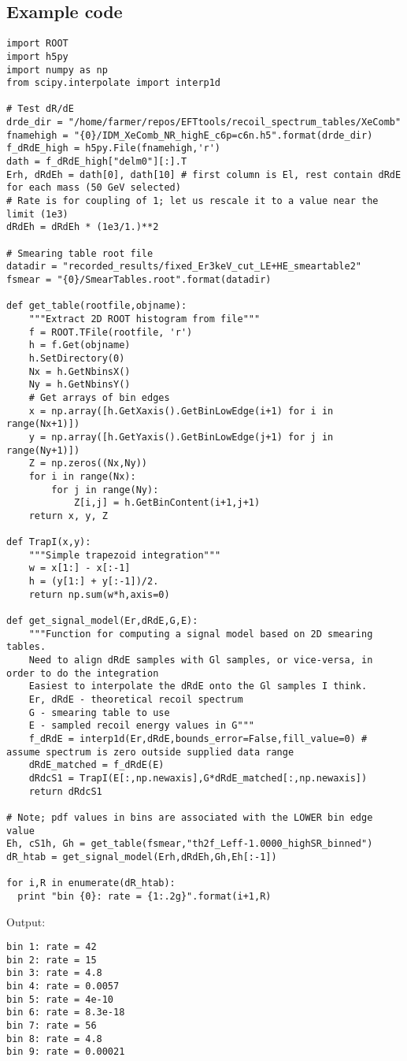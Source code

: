 \subsection{Example code}
\label{app:example_code}
\begin{lstlisting}
import ROOT
import h5py
import numpy as np
from scipy.interpolate import interp1d

# Test dR/dE
drde_dir = "/home/farmer/repos/EFTtools/recoil_spectrum_tables/XeComb"
fnamehigh = "{0}/IDM_XeComb_NR_highE_c6p=c6n.h5".format(drde_dir)
f_dRdE_high = h5py.File(fnamehigh,'r')
dath = f_dRdE_high["delm0"][:].T
Erh, dRdEh = dath[0], dath[10] # first column is El, rest contain dRdE for each mass (50 GeV selected)
# Rate is for coupling of 1; let us rescale it to a value near the limit (1e3)
dRdEh = dRdEh * (1e3/1.)**2

# Smearing table root file
datadir = "recorded_results/fixed_Er3keV_cut_LE+HE_smeartable2"
fsmear = "{0}/SmearTables.root".format(datadir)

def get_table(rootfile,objname):
    """Extract 2D ROOT histogram from file""" 
    f = ROOT.TFile(rootfile, 'r')
    h = f.Get(objname)
    h.SetDirectory(0)
    Nx = h.GetNbinsX()
    Ny = h.GetNbinsY()
    # Get arrays of bin edges
    x = np.array([h.GetXaxis().GetBinLowEdge(i+1) for i in range(Nx+1)])
    y = np.array([h.GetYaxis().GetBinLowEdge(j+1) for j in range(Ny+1)])
    Z = np.zeros((Nx,Ny))
    for i in range(Nx):
        for j in range(Ny):
            Z[i,j] = h.GetBinContent(i+1,j+1)
    return x, y, Z

def TrapI(x,y):
    """Simple trapezoid integration"""
    w = x[1:] - x[:-1]
    h = (y[1:] + y[:-1])/2.
    return np.sum(w*h,axis=0)

def get_signal_model(Er,dRdE,G,E):
    """Function for computing a signal model based on 2D smearing tables.
    Need to align dRdE samples with Gl samples, or vice-versa, in order to do the integration
    Easiest to interpolate the dRdE onto the Gl samples I think.
    Er, dRdE - theoretical recoil spectrum
    G - smearing table to use
    E - sampled recoil energy values in G"""
    f_dRdE = interp1d(Er,dRdE,bounds_error=False,fill_value=0) # assume spectrum is zero outside supplied data range
    dRdE_matched = f_dRdE(E)
    dRdcS1 = TrapI(E[:,np.newaxis],G*dRdE_matched[:,np.newaxis])
    return dRdcS1

# Note; pdf values in bins are associated with the LOWER bin edge value
Eh, cS1h, Gh = get_table(fsmear,"th2f_Leff-1.0000_highSR_binned")
dR_htab = get_signal_model(Erh,dRdEh,Gh,Eh[:-1]) 

for i,R in enumerate(dR_htab):
  print "bin {0}: rate = {1:.2g}".format(i+1,R)
\end{lstlisting}

Output:

\begin{lstlisting}
bin 1: rate = 42
bin 2: rate = 15
bin 3: rate = 4.8
bin 4: rate = 0.0057
bin 5: rate = 4e-10
bin 6: rate = 8.3e-18
bin 7: rate = 56
bin 8: rate = 4.8
bin 9: rate = 0.00021
\end{lstlisting}
